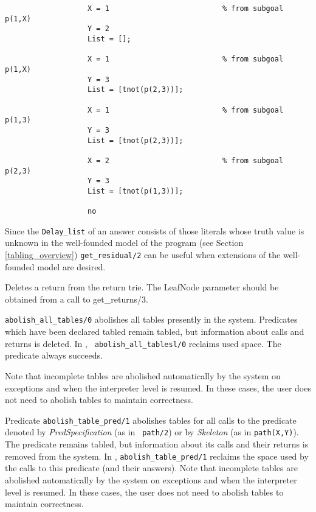 \begin{description}
{\begin{verbatim}
                   X = 1                          % from subgoal p(1,X)
                   Y = 2
                   List = [];

                   X = 1                          % from subgoal p(1,X)
                   Y = 3
                   List = [tnot(p(2,3))];

                   X = 1                          % from subgoal p(1,3)
                   Y = 3
                   List = [tnot(p(2,3))];

                   X = 2                          % from subgoal p(2,3)
                   Y = 3
                   List = [tnot(p(1,3))];

                   no

     \end{verbatim}
     }
Since the {\tt Delay\_list} of an answer consists of those literals
whose truth value is unknown in the well-founded model of the program
(see Section \ref{tabling_overview}) {\tt get\_residual/2} can be
useful when extensions of the well-founded model are desired.

Deletes a return from the return trie. The LeafNode parameter should
be obtained from a call to get\_returns/3.


{\tt abolish\_all\_tables/0} abolishes all tables presently in the
system.  Predicates which have been declared tabled remain tabled, but
information about calls and returns is deleted.  In \version, {\tt
abolish\_all\_tablesl/0} reclaims used space.  The predicate always 
succeeds.

Note that incomplete tables are abolished automatically by the system on
exceptions and when the interpreter level is resumed.  In these cases,
the user does not need to abolish tables to maintain correctness.


%
Predicate {\tt abolish\_table\_pred/1} abolishes tables for all calls
to the predicate denoted by {\em PredSpecification} (as in {\tt
path/2}) or by {\em Skeleton} (as in {\tt path(X,Y)}).  The predicate
remains tabled, but information about its calls and their returns is
removed from the system.  In \version, {\tt abolish\_table\_pred/1}
reclaims the space used by the calls to this predicate (and their
answers).  Note that incomplete tables are abolished automatically by
the system on exceptions and when the interpreter level is resumed.
In these cases, the user does not need to abolish tables to maintain
correctness.


\end{description}

